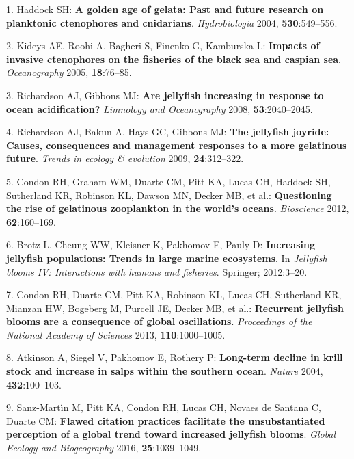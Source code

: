 \documentclass[
]{article}
\newlength{\cslhangindent}
\newenvironment{CSLReferences}[2] %
 {\begin{list}{}{%
  \setlength{\itemindent}{0pt}
  \setlength{\leftmargin}{0pt}
  \setlength{\parsep}{0pt}
  \ifodd #1
   \setlength{\leftmargin}{\cslhangindent}
   \setlength{\itemindent}{-1\cslhangindent}
  \fi
  \setlength{\itemsep}{#2\baselineskip}}}
 {\end{list}}
\begin{document}
\label{refs}
\begin{CSLReferences}{0}{1}
1. Haddock SH: \textbf{A golden age of gelata: Past and future research
on planktonic ctenophores and cnidarians}. \emph{Hydrobiologia} 2004,
\textbf{530}:549--556.

2. Kideys AE, Roohi A, Bagheri S, Finenko G, Kamburska L:
\textbf{Impacts of invasive ctenophores on the fisheries of the black
sea and caspian sea}. \emph{Oceanography} 2005, \textbf{18}:76--85.

3. Richardson AJ, Gibbons MJ: \textbf{Are jellyfish increasing in
response to ocean acidification?} \emph{Limnology and Oceanography}
2008, \textbf{53}:2040--2045.

4. Richardson AJ, Bakun A, Hays GC, Gibbons MJ: \textbf{The jellyfish
joyride: Causes, consequences and management responses to a more
gelatinous future}. \emph{Trends in ecology \& evolution} 2009,
\textbf{24}:312--322.

5. Condon RH, Graham WM, Duarte CM, Pitt KA, Lucas CH, Haddock SH,
Sutherland KR, Robinson KL, Dawson MN, Decker MB, et al.:
\textbf{Questioning the rise of gelatinous zooplankton in the world's
oceans}. \emph{Bioscience} 2012, \textbf{62}:160--169.

6. Brotz L, Cheung WW, Kleisner K, Pakhomov E, Pauly D:
\textbf{Increasing jellyfish populations: Trends in large marine
ecosystems}. In \emph{Jellyfish blooms IV: Interactions with humans and
fisheries}. Springer; 2012:3--20.

7. Condon RH, Duarte CM, Pitt KA, Robinson KL, Lucas CH, Sutherland KR,
Mianzan HW, Bogeberg M, Purcell JE, Decker MB, et al.: \textbf{Recurrent
jellyfish blooms are a consequence of global oscillations}.
\emph{Proceedings of the National Academy of Sciences} 2013,
\textbf{110}:1000--1005.

8. Atkinson A, Siegel V, Pakhomov E, Rothery P: \textbf{Long-term
decline in krill stock and increase in salps within the southern ocean}.
\emph{Nature} 2004, \textbf{432}:100--103.

9. Sanz-Martı́n M, Pitt KA, Condon RH, Lucas CH, Novaes de Santana C,
Duarte CM: \textbf{Flawed citation practices facilitate the
unsubstantiated perception of a global trend toward increased jellyfish
blooms}. \emph{Global Ecology and Biogeography} 2016,
\textbf{25}:1039--1049.

\end{CSLReferences}
\end{document}
